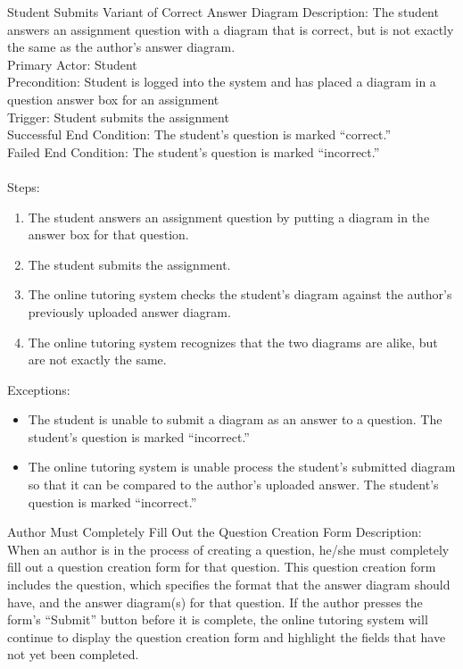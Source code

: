     \begin{section}{Student Submits Variant of Correct Answer Diagram}
        Description: The student answers an assignment question with a diagram that is correct, but is not exactly the same as the author’s answer diagram. \\
        Primary Actor: Student \\
        Precondition: Student is logged into the system and has placed a diagram in a question answer box for an assignment \\ 
        Trigger: Student submits the assignment \\
        Successful End Condition: The student’s question is marked “correct.” \\
        Failed End Condition: The student’s question is marked “incorrect.” \\
        \\
        Steps:
        \begin{enumerate}
            \item{The student answers an assignment question by putting a diagram in the answer box for that question.}
            \item{The student submits the assignment.}
            \item{The online tutoring system checks the student’s diagram against the author’s previously uploaded answer diagram.}
            \item{The online tutoring system recognizes that the two diagrams are alike, but are not exactly the same.}
        \end{enumerate}
        Exceptions:
        \begin{itemize}
            \item{The student is unable to submit a diagram as an answer to a question.  The student’s question is marked “incorrect.”} 
            \item{The online tutoring system is unable process the student’s submitted diagram so that it can be compared to the author’s uploaded answer.  
            The student’s question is marked “incorrect.”}
        \end{itemize}
    \end{section}
    
    \begin{section}{Author Must Completely Fill Out the Question Creation Form}
        Description: When an author is in the process of creating a question, he/she must completely
        fill out a question creation form for that question.  This question creation form includes the question, 
        which specifies the format that the answer diagram should have, and the answer diagram(s) for that question. 
        If the author presses the form’s “Submit” button before it is complete, the online tutoring
        system will continue to display the question creation form and highlight the fields that have 
        not yet been completed.
    \end{section}


    


